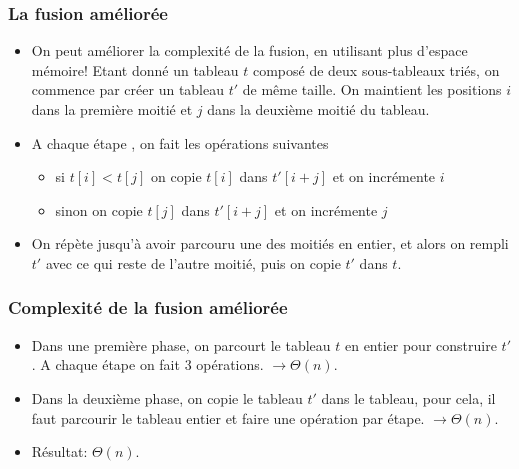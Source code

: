\documentclass[aspectratio=169]{beamer}
\begin{document}
\begin{frame}
    \frametitle{La fusion améliorée}

    \begin{itemize}
    \item On peut améliorer la complexité de la fusion, en utilisant plus
      d'espace mémoire! Etant donné un tableau \(t\) composé de deux
      sous-tableaux triés, on commence par créer un tableau \(t'\) de même
      taille. On maintient les positions \(i\) dans la première moitié et \(j\)
      dans la deuxième moitié du tableau.

    \item A chaque étape , on fait les opérations suivantes
      \begin{itemize}
      \item si \(t[i]<t[j]\) on copie \(t[i]\) dans \(t'[i+j]\) et on incrémente \(i\)
      \item sinon on copie \(t[j]\) dans \(t'[i+j]\) et on incrémente \(j\)
      \end{itemize}

    \item On répète jusqu'à avoir parcouru une des moitiés en entier, et alors
      on rempli \(t'\) avec ce qui reste de l'autre moitié, puis on copie \(t'\)
      dans \(t\).
    \end{itemize}
\end{frame}

\begin{frame}
    \frametitle{Complexité de la fusion améliorée}

    \begin{itemize}
    \item Dans une première phase, on parcourt le tableau \(t\) en entier pour
      construire \(t'\). A chaque étape on fait \(3\) opérations.
      \(\to \Theta(n)\).

    \item Dans la deuxième phase, on copie le tableau \(t'\) dans le tableau,
      pour cela, il faut parcourir le tableau entier et faire une opération par
      étape. \(\to \Theta(n)\).

    \item Résultat: \(\Theta(n)\).
    \end{itemize}
\end{frame}
\end{document}
